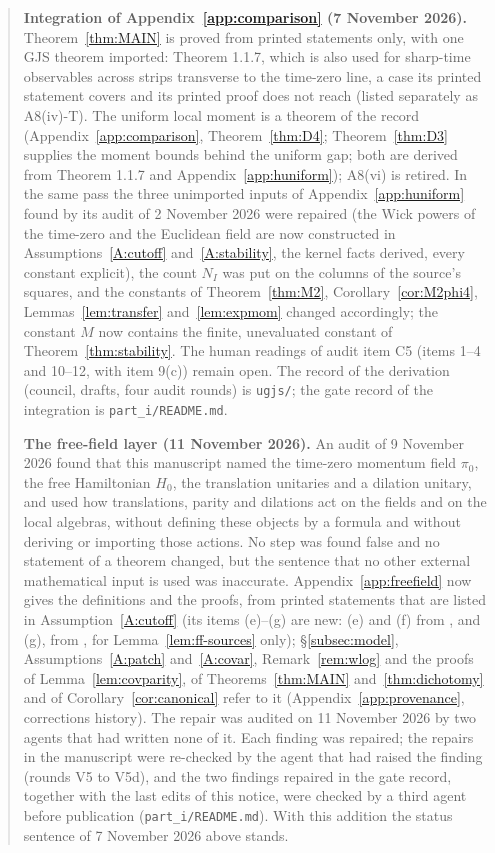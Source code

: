 \documentclass[11pt,a4paper]{article}
\theoremstyle{plain}
\theoremstyle{definition}
\theoremstyle{plain}
\theoremstyle{definition}
\begin{document}
\begin{quote}
\smallskip
\textbf{Integration of Appendix~\ref{app:comparison} (7 November 2026).}
Theorem~\ref{thm:MAIN} is proved from printed statements only, with one GJS theorem
imported: Theorem 1.1.7, which is also used for sharp-time observables across strips
transverse to the time-zero line, a case its printed statement covers and its printed
proof does not reach (listed separately as A8(iv)-T).  The uniform local moment is a
theorem of the record (Appendix~\ref{app:comparison}, Theorem~\ref{thm:D4}; Theorem~\ref{thm:D3}
supplies the moment bounds behind the uniform gap; both are derived from Theorem 1.1.7 and
Appendix~\ref{app:huniform}); A8(vi) is retired.  In the same pass the three unimported inputs of Appendix~\ref{app:huniform} found
by its audit of 2 November 2026 were repaired (the Wick powers of the time-zero and the
Euclidean field are now constructed in Assumptions~\ref{A:cutoff} and~\ref{A:stability},
the kernel facts derived, every constant explicit), the count $N_I$ was put on the columns
of the source's squares, and the constants of Theorem~\ref{thm:M2}, Corollary~\ref{cor:M2phi4},
Lemmas~\ref{lem:transfer} and~\ref{lem:expmom} changed accordingly; the constant $M$ now
contains the finite, unevaluated constant of Theorem~\ref{thm:stability}.  The human
readings of audit item C5 (items 1--4 and 10--12, with item 9(c)) remain open.  The record of the derivation
(council, drafts, four audit rounds) is \texttt{ugjs/}; the gate record of the integration is
\texttt{part\_i/README.md}.

\smallskip
\textbf{The free-field layer (11 November 2026).}  An audit of 9 November 2026 found that
this manuscript named the time-zero momentum field $\pi_0$, the free Hamiltonian $H_0$, the
translation unitaries and a dilation unitary, and used how translations, parity and dilations
act on the fields and on the local algebras, without defining these objects by a formula and
without deriving or importing those actions.  No step was found false and no statement of a
theorem changed, but the sentence that no other external mathematical input is used was
inaccurate.  Appendix~\ref{app:freefield} now gives the definitions and the proofs, from
printed statements that are listed in Assumption~\ref{A:cutoff} (its items (e)--(g) are new:
(e) and (f) from \cite{SimonBook}, and (g), from \cite{GJ2}, for
Lemma~\ref{lem:ff-sources} only); \S\ref{subsec:model}, Assumptions~\ref{A:patch}
and~\ref{A:covar}, Remark~\ref{rem:wlog} and the proofs of Lemma~\ref{lem:covparity}, of
Theorems~\ref{thm:MAIN} and~\ref{thm:dichotomy} and of Corollary~\ref{cor:canonical} refer
to it (Appendix~\ref{app:provenance}, corrections history).  The repair was audited on
11 November 2026 by two agents that had written none of it.  Each finding was repaired; the
repairs in the manuscript were re-checked by the agent that had raised the finding (rounds V5
to V5d), and the two findings repaired in the gate record, together with the last edits of
this notice, were checked by a third agent before publication
(\texttt{part\_i/README.md}).  With this addition the status sentence of 7 November 2026
above stands.


\end{quote}
\end{document}
